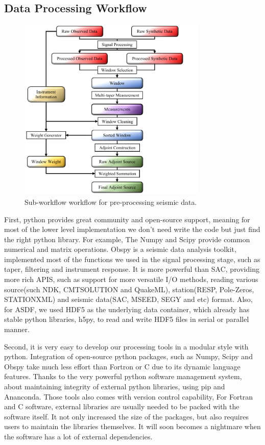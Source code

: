 \subsection{Data Processing Workflow}
\begin{figure}
  \centering
  \includegraphics[width=0.8\textwidth]{ch-GLADM25/figures/Preprocess_workflow.pdf}
  \caption[Sub-workflow workflow for pre-processing seismic data]
  {\small{Sub-workflow workflow for pre-processing seismic data.}}
  \label{fig:preprocess_workflow}
\end{figure}

First, python provides great community and open-source support, meaning for most
of the lower level implementation we don't need write the code but
just find the right python library. For example,
The Numpy and Scipy provide common numerical and matrix operations.
Obspy is a seismic data analysis toolkit, implemented
most of the functions we used in the signal processing stage, such as taper, filtering
and instrument response. It is more powerful than SAC,
providing more rich APIS, such as support for more versatile I/O methods, reading
various source(such NDK, CMTSOLUTION and QuakeML), station(RESP, Pole-Zeros, STATIONXML)
and seismic data(SAC, MSEED, SEGY and etc) format.
Also, for ASDF, we used HDF5 as the underlying data container, which already has
stable python libraries, h5py, to read and write HDF5 files in serial or parallel manner.

Second, it is very easy to develop our processing tools in a modular style with python.
Integration of open-source python packages, such as Numpy, Scipy and Obspy take much
less effort than Fortron or C due to its dynamic language features.
Thanks to the very powerful python software management system,
about maintaining integrity of external python libraries, using pip and Ananconda.
Those tools also comes with version control capability,
For Fortran and C software, external libraries
are usually needed to be packed with the software itself. It not only increased the size
of the packages, but also requires users to maintain the libraries themselves. It will
 soon becomes a nightmare when the software has a lot of external dependencies.

